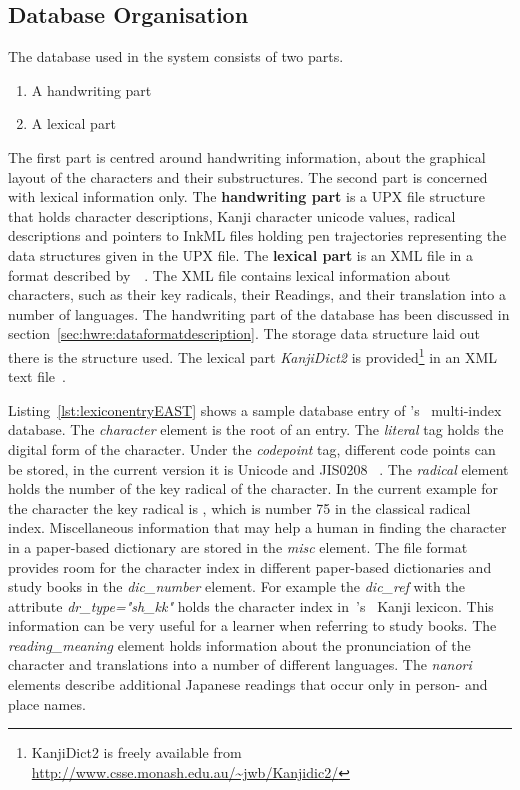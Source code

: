 
\subsection{Database Organisation}
\label{sec:hwre:databaseorganisation}

The database used in the system consists of two parts. 
\begin{enumerate}
\item A handwriting part
\item A lexical part
\end{enumerate}
The first part is centred around handwriting information, 
about the graphical layout of the characters and their substructures.
The second part is concerned with lexical information only.
The \textbf{handwriting part} is a UPX file structure that holds character 
descriptions, Kanji character unicode values, radical descriptions 
and pointers to InkML files holding pen trajectories representing the
data structures given in the UPX file.
The \textbf{lexical part} is an XML file in a format described 
by~~\citeyear{Breen2004}. The XML file contains 
lexical information about characters, such as their key radicals, their Readings,
and their translation into a number of languages.
The handwriting part of the database has been discussed in 
section~\ref{sec:hwre:dataformatdescription}. The storage data structure laid
out there is the structure used.
The lexical part \emph{KanjiDict2} is 
provided\footnote{KanjiDict2 is freely available from \url{http://www.csse.monash.edu.au/~jwb/Kanjidic2/}} in an XML text file~.

Listing~\ref{lst:lexiconentryEAST} shows a sample database entry of 
's~\citeyear{Breen2004} 
multi-index database.
The \emph{character} element is the root of an entry. The \emph{literal} tag 
holds the digital form of the character. Under the \emph{codepoint} tag, 
different code points can be stored, in the current version it is Unicode and 
JIS0208 ~. 
The \emph{radical} element holds the number of the key radical of the character.
In the current example for the character  the key radical is ,
which is number 75 in the classical radical index.
Miscellaneous information that may help a human in finding the character in a 
paper-based dictionary are stored in the \emph{misc} element.
The file format provides room for the character index in different paper-based
dictionaries and study books in the \emph{dic\_number} element. For example 
the \emph{dic\_ref} with the attribute \emph{dr\_type="sh\_kk"} holds the
character index in~'s~\citeyear{Hadamitzky1995} 
Kanji lexicon. This information can be very
useful for a learner when referring to study books. The \emph{reading\_meaning}
element holds information about the pronunciation of the character and 
translations into a number of different languages. The \emph{nanori} elements
describe additional Japanese readings that occur only in person- and place names.

